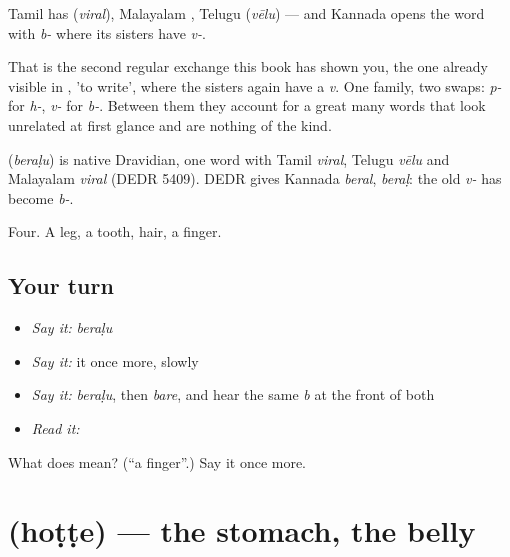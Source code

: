 Tamil has  (\emph{viral}), Malayalam , Telugu  (\emph{vēlu}) — and Kannada opens the word with \emph{b-} where its sisters have \emph{v-}.

That is the second regular exchange this book has shown you, the one already visible in , 'to write', where the sisters again have a \emph{v}. One family, two swaps: \emph{p-} for \emph{h-}, \emph{v-} for \emph{b-}. Between them they account for a great many words that look unrelated at first glance and are nothing of the kind.

\begin{cousinweb}
\textbf{} (\emph{beraḷu}) is native Dravidian, one word with Tamil \emph{viral}, Telugu \emph{vēlu} and Malayalam \emph{viral} (DEDR 5409). DEDR gives Kannada \emph{beral}, \emph{beraḷ}: the old \emph{v-} has become \emph{b-}.
\end{cousinweb}

\begin{grammarlens}[title={What you've built}]
Four. A leg, a tooth, hair, a finger.
\end{grammarlens}

\subsection*{Your turn}
\begin{itemize}
\raggedright
  \item \emph{Say it:} \emph{beraḷu}
  \item \emph{Say it:} it once more, slowly
  \item \emph{Say it:} \emph{beraḷu}, then \emph{bare}, and hear the same \emph{b} at the front of both
  \item \emph{Read it:} \textbf{}
\end{itemize}

\begin{tcolorbox}[breakable,colback=teal!4,colframe=teal!35!black,title={Before you move on}]
What does  mean? (\textquotedblleft{}a finger\textquotedblright{}.) Say it once more.
\end{tcolorbox}
\section[\texorpdfstring{\kn{ಹೊಟ್ಟೆ} (hoṭṭe)}{ಹೊಟ್ಟೆ (hoṭṭe)}]{ (hoṭṭe) — the stomach, the belly}

\label{lesson:KA-C47-stomach}




